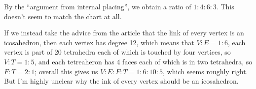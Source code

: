 \documentclass[11pt]{article}
\newenvironment{exercise}[2][Exercise]{\begin{trivlist}
\item[\hskip \labelsep {\bfseries #1}\hskip \labelsep {\bfseries #2}]}{\end{trivlist}}
\begin{document}
\begin{exercise}{2.7, Mean Valence (Tetrahedral).}
  By the ``argument from internal placing'', we obtain a ratio of $1:4:6:3$. This doesn't seem to match the chart at all.

  If we instead take the advice from the article that the link of every vertex is an icosahedron, then each vertex has degree 12, which means that $V:E = 1:6$, each vertex is part of 20 tetrahedra each of which is touched by four vertices, so $V:T = 1:5$, and each tetreaheron has 4 faces each of which is in two tetrahedra, so $F:T = 2:1$; overall this gives us $V:E:F:T = 1:6:10:5$, which seems roughly right. But I'm highly unclear why the ink of every vertex should be an icosahedron.
\end{exercise}

\begin{exercise}{2.8, Star, Closure and Link.}
\end{exercise}

\begin{exercise}{2.9, Boundary and Interior.}
\end{exercise}

\begin{exercise}{2.10, Surface as Permutation.}
\end{exercise}

\begin{exercise}{2.11, Permutation as Surface.}
\end{exercise}

\begin{exercise}{2.12, Surface as Matrices.}
\end{exercise}

\begin{exercise}{2.13, Classification of Simplicial 1-Manifolds.}
\end{exercise}

\begin{exercise}{2.14, Boundary Loops.}
\end{exercise}

\begin{exercise}{2.15, Boundary Has No Boundary.}
\end{exercise}
\end{document}
